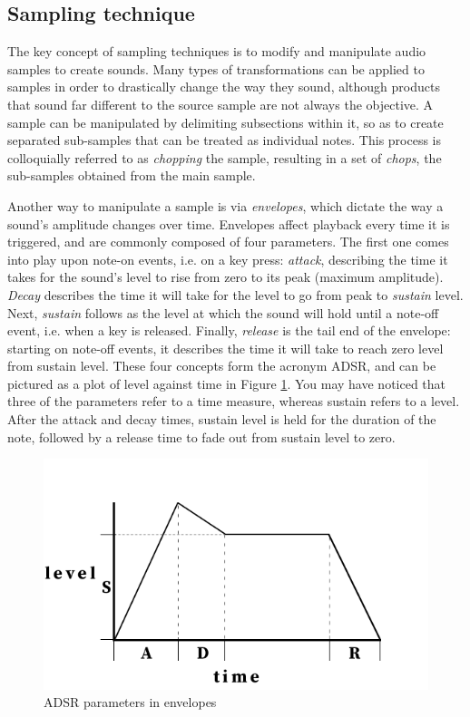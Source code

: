 \documentclass[12pt, a4paper, hidelinks]{report}
\begin{document}
	\subsection{Sampling technique} \label{st}
	The key concept of sampling techniques is to modify and manipulate audio samples to create sounds. Many types of transformations can be applied to samples in order to drastically change the way they sound, although products that sound far different to the source sample are not always the objective. A sample can be manipulated by delimiting subsections within it, so as to create separated sub-samples that can be treated as individual notes. This process is colloquially referred to as \textit{chopping} the sample, resulting in a set of \textit{chops}, the sub-samples obtained from the main sample. \par
	Another way to manipulate a sample is via \textit{envelopes}, which dictate the way a sound's amplitude changes over time. Envelopes affect playback every time it is triggered, and are commonly composed of four parameters. The first one comes into play upon note-on events, i.e. on a key press: \textit{attack}, describing the time it takes for the sound's level to rise from zero to its peak (maximum amplitude). \textit{Decay} describes the time it will take for the level to go from peak to \textit{sustain} level. Next, \textit{sustain} follows as the level at which the sound will hold until a note-off event, i.e. when a key is released. Finally, \textit{release} is the tail end of the envelope: starting on note-off events, it describes the time it will take to reach zero level from sustain level. These four concepts form the acronym ADSR, and can be pictured as a plot of level against time in Figure \ref{fig:envelope}. You may have noticed that three of the parameters refer to a time measure, whereas sustain refers to a level. After the attack and decay times, sustain level is held for the duration of the note, followed by a release time to fade out from sustain level to zero.\par
	
	
	\begin{figure}[h]
		\centering
		\includegraphics[scale=0.4]{envelope.png}
		\caption{ADSR parameters in envelopes}
		\label{fig:envelope}
	\end{figure}
	
\end{document}
